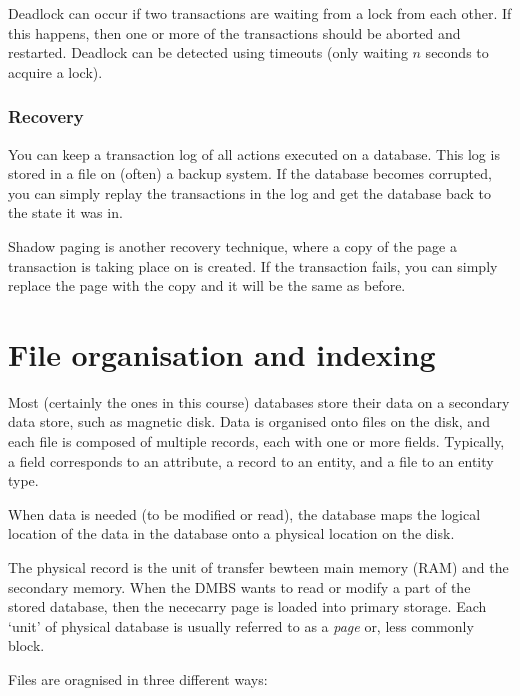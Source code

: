 Deadlock can occur if two transactions are waiting from a lock from each other.
If this happens, then one or more of the transactions should be aborted and
restarted. Deadlock can be detected using timeouts (only waiting $n$ seconds to
acquire a lock).

\subsubsection*{Recovery}

You can keep a transaction log of all actions executed on a database. This log
is stored in a file on (often) a backup system. If the database becomes
corrupted, you can simply replay the transactions in the log and get the
database back to the state it was in.

Shadow paging is another recovery technique, where a copy of the page a
transaction is taking place on is created. If the transaction fails, you can
simply replace the page with the copy and it will be the same as before.

\section{File organisation and indexing}

Most (certainly the ones in this course) databases store their data on a
secondary data store, such as magnetic disk. Data is organised onto files on the
disk, and each file is composed of multiple records, each with one or more
fields. Typically, a field corresponds to an attribute, a record to an entity,
and a file to an entity type.

When data is needed (to be modified or read), the database maps the logical
location of the data in the database onto a physical location on the disk.

The physical record is the unit of transfer bewteen main memory (RAM) and the
secondary memory. When the DMBS wants to read or modify a part of the stored
database, then the nececarry page is loaded into primary storage. Each `unit' of
physical database is usually referred to as a \textit{page} or, less commonly
block.

Files are oragnised in three different ways:

